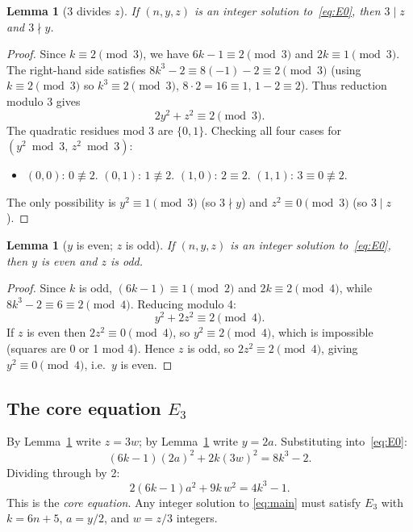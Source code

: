 \documentclass[12pt]{article}
\newtheorem{lemma}[theorem]{Lemma}
\begin{document}
\begin{lemma}[3 divides $z$]\label{lem:3divz}
If $(n,y,z)$ is an integer solution to~\eqref{eq:E0}, then $3 \mid z$ and $3 \nmid y$.
\end{lemma}
\begin{proof}
Since $k \equiv 2 \pmod{3}$, we have $6k - 1 \equiv 2 \pmod{3}$ and $2k \equiv 1 \pmod{3}$.
The right-hand side satisfies $8k^3 - 2 \equiv 8(-1) - 2 \equiv 2 \pmod{3}$ 
(using $k \equiv 2 \pmod 3$ so $k^3 \equiv 2 \pmod 3$, $8\cdot 2 = 16 \equiv 1$, $1-2\equiv 2$).
Thus reduction modulo 3 gives
\[
2y^2 + z^2 \equiv 2 \pmod{3}.
\]
The quadratic residues mod 3 are $\{0,1\}$. Checking all four cases for $(y^2 \bmod 3,\, z^2 \bmod 3)$:
\begin{itemize}
  \item $(0,0)$: $0 \not\equiv 2$. \quad $(0,1)$: $1\not\equiv 2$. \quad $(1,0)$: $2 \equiv 2$. \quad $(1,1)$: $3\equiv 0 \not\equiv 2$.
\end{itemize}
The only possibility is $y^2 \equiv 1 \pmod 3$ (so $3\nmid y$) and $z^2 \equiv 0 \pmod 3$ (so $3\mid z$).
\end{proof}

\begin{lemma}[$y$ is even; $z$ is odd]\label{lem:parity}
If $(n,y,z)$ is an integer solution to~\eqref{eq:E0}, then $y$ is even and $z$ is odd.
\end{lemma}
\begin{proof}
Since $k$ is odd, $(6k-1) \equiv 1 \pmod 2$ and $2k \equiv 2 \pmod 4$, while
$8k^3 - 2 \equiv 6 \equiv 2 \pmod 4$. Reducing modulo 4:
\[
y^2 + 2z^2 \equiv 2 \pmod{4}.
\]
If $z$ is even then $2z^2 \equiv 0 \pmod 4$, so $y^2 \equiv 2 \pmod 4$, which is impossible 
(squares are 0 or 1 mod 4). 
Hence $z$ is odd, so $2z^2 \equiv 2 \pmod 4$, giving $y^2 \equiv 0 \pmod 4$, i.e.\ $y$ is even.
\end{proof}

\subsection{The core equation \texorpdfstring{$E_3$}{E3}}

By Lemma~\ref{lem:3divz} write $z = 3w$; by Lemma~\ref{lem:parity} write $y = 2a$. 
Substituting into~\eqref{eq:E0}:
\[
(6k-1)(2a)^2 + 2k(3w)^2 = 8k^3 - 2.
\]
Dividing through by 2:
\begin{equation}\label{eq:E3}
\tag{$E_3$}
2(6k-1)a^2 + 9k\,w^2 = 4k^3 - 1.
\end{equation}
This is the \emph{core equation}. Any integer solution to \eqref{eq:main} must satisfy $E_3$ with 
$k = 6n+5$, $a = y/2$, and $w = z/3$ integers.
\end{document}

